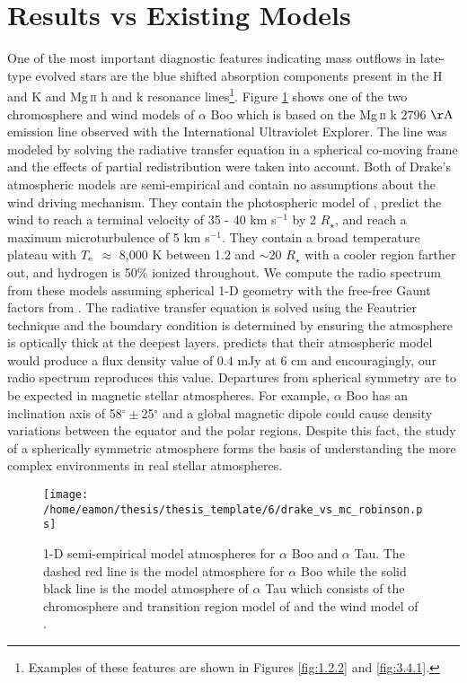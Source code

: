 \section{Results vs Existing Models}\label{sec:6.5}
One of the most important diagnostic features indicating mass outflows in late-type evolved stars are the blue shifted absorption components present in the  H and K and Mg\,\textsc{ii} h and k resonance lines\footnote{Examples of these features are shown in Figures \ref{fig:1.2.2} and \ref{fig:3.4.1}.}. Figure \ref{fig6.5.1} shows one of the two chromosphere and wind models of $\alpha$ Boo \cite[`model A']{drake_1985} which is based on the Mg\,\textsc{ii} k 2796 $\rm{\AA}$ emission line observed with the International Ultraviolet Explorer. The line was modeled by solving the radiative transfer equation in a spherical co-moving frame and the effects of partial redistribution \citep[e.g.,][]{drake_1983b} were taken into account. Both of Drake’s atmospheric models
are semi-empirical and contain no assumptions about the wind driving mechanism. They contain the photospheric model of \cite{ayres_1975}, predict the wind to reach a terminal velocity of 35 - 40 km s${}^{-1}$ by 2 $R _{\star}$, and reach a maximum microturbulence of 5 km s$^{-1}$. They contain a broad temperature plateau with $T_{\rm{e}}$ $\approx$ 8,000 K between 1.2 and $\sim$20 $R _{\star}$ with a cooler region farther out, and hydrogen is 50\% ionized throughout. We compute the radio spectrum from these models assuming spherical 1-D geometry \citep{harper_1994} with the free-free Gaunt factors from \cite{hummer_1988}. The radiative transfer equation is solved using the Feautrier technique \citep{mihalas_1978} and the boundary condition is determined by ensuring the atmosphere is optically thick at the deepest layers. \cite{drake_1985} predicts that their atmospheric model would produce a flux density value of 0.4 mJy at 6 cm and encouragingly, our radio spectrum reproduces this value. Departures from spherical symmetry are to be expected in magnetic stellar atmospheres. For example, $\alpha$ Boo has an inclination axis of 58$^{\circ} \pm$25$^{\circ}$ \citep{gray_2006} and a global magnetic dipole could cause density variations between the equator and the polar regions. Despite this fact, the study of a  spherically symmetric atmosphere forms the basis of understanding the more complex environments in real stellar atmospheres.

\begin{figure}[hbt!]
\centering 
          \texttt{[image: /home/eamon/thesis/thesis\_template/6/drake\_vs\_mc\_robinson.ps]}
\caption[1-D semi-empirical model atmospheres for $\alpha$ Boo and $\alpha$ Tau]{1-D semi-empirical model atmospheres for $\alpha$ Boo and $\alpha$ Tau. The dashed red line is the model atmosphere for $\alpha$ Boo \citep{drake_1985} while the solid black line is the model atmosphere of $\alpha$ Tau which consists of the chromosphere and transition region model of \cite{mcmurry_1999} and the wind model of \cite{robinson_1998}.}
\label{fig6.5.1}
\end{figure}


